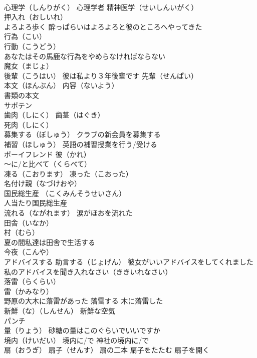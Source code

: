 \documentclass[8pt]{extreport}
\begin{document}
\begin{CJK}{UTF8}{min}
\\	心理学（しんりがく） 心理学者 精神医学（せいしんいがく）
\\	押入れ（おしいれ）
\\	よろよろ歩く 酔っぱらいはよろよろと彼のところへやってきた
\\	行為（こい）
\\	行動（こうどう）
\\	あなたはその馬鹿な行為をやめらなければならない
\\	魔女（まじょ）
\\	後輩（こうはい） 彼は私より３年後輩です 先輩（せんぱい）
\\	本文（ほんぶん） 内容（ないよう）
\\	書類の本文
\\	サボテン
\\	歯肉（しにく） 歯茎（はぐき）
\\	死肉（しにく）
\\	募集する（ぼしゅう） クラブの新会員を募集する
\\	補習（ほしゅう） 英語の補習授業を行う/受ける
\\	ボーイフレンド 彼（かれ）
\\	～に/と比べて（くらべて）
\\	凍る（こおります） 凍った（こおった）
\\	名付け親（なづけおや）
\\	国民総生産 （こくみんそうせいさん） 
\\	人当たり国民総生産
\\	流れる（ながれます） 涙がほおを流れた
\\	田舎（いなか）
\\	村（むら） 
\\	夏の間私達は田舎で生活する
\\	今夜（こんや）
\\	アドバイスする 助言する（じょげん） 彼女がいいアドバイスをしてくれました 私のアドバイスを聞き入れなさい（ききいれなさい）
\\	落雷（らくらい）
\\	雷（かみなり）
\\	野原の大木に落雷があった 落雷する 木に落雷した
\\	新鮮（な）（しんせん） 新鮮な空気
\\	パンチ 
\\	量（りょう） 砂糖の量はこのぐらいでいいですか
\\	境内（けいだい） 境内に/で 神社の境内に/で
\\	扇（おうぎ） 扇子（せんす） 扇の二本 扇子をたたむ 扇子を開く

\end{CJK}
\end{document}
